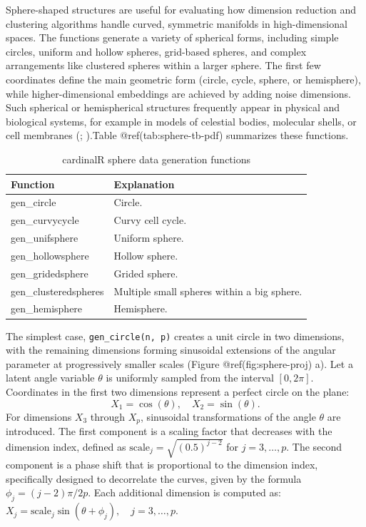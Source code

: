 \documentclass[
  11pt,
  a4paper,
]{report}
\begin{document}
Sphere-shaped structures are useful for evaluating how dimension
reduction and clustering algorithms handle curved, symmetric manifolds
in high-dimensional spaces. The functions generate a variety of
spherical forms, including simple circles, uniform and hollow spheres,
grid-based spheres, and complex arrangements like clustered spheres
within a larger sphere. The first few coordinates define the main
geometric form (circle, cycle, sphere, or hemisphere), while
higher-dimensional embeddings are achieved by adding noise dimensions.
Such spherical or hemispherical structures frequently appear in physical
and biological systems, for example in models of celestial bodies,
molecular shells, or cell membranes
(;
).Table
@ref(tab:sphere-tb-pdf) summarizes these functions.

\begin{table}

\caption{\label{tab:sphere-tb-pdf}cardinalR sphere data generation functions}
\centering
\begin{tabular}[t]{>{\raggedright\arraybackslash}p{4cm}>{\raggedright\arraybackslash}p{8cm}}
\toprule
Function & Explanation\\
\midrule
gen\_circle & Circle.\\
gen\_curvycycle & Curvy cell cycle.\\
gen\_unifsphere & Uniform sphere.\\
gen\_hollowsphere & Hollow sphere.\\
gen\_gridedsphere & Grided sphere.\\
gen\_clusteredspheres & Multiple small spheres within a big sphere.\\
gen\_hemisphere & Hemisphere.\\
\bottomrule
\end{tabular}
\end{table}

The simplest case, \texttt{gen\_circle(n,\ p)} creates a unit circle in
two dimensions, with the remaining dimensions forming sinusoidal
extensions of the angular parameter at progressively smaller scales
(Figure @ref(fig:sphere-proj) a). Let a latent angle variable \(\theta\)
is uniformly sampled from the interval \([0, 2\pi]\). Coordinates in the
first two dimensions represent a perfect circle on the plane:
\[X_1 = \cos(\theta), \quad X_2 = \sin(\theta).\] For dimensions \(X_3\)
through \(X_p\), sinusoidal transformations of the angle \(\theta\) are
introduced. The first component is a scaling factor that decreases with
the dimension index, defined as \(\text{scale}_j = \sqrt{(0.5)^{j-2}}\)
for \(j = 3, \dots, p\). The second component is a phase shift that is
proportional to the dimension index, specifically designed to
decorrelate the curves, given by the formula \(\phi_j = (j - 2)\pi/2p\).
Each additional dimension is computed as:
\(X_j = \text{scale}_{j}\sin(\theta + \phi_j), \quad j = 3, \dots, p\).
\end{document}
